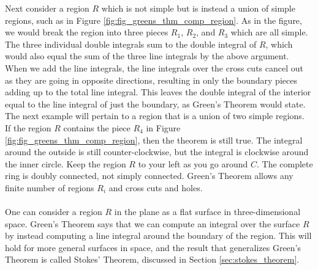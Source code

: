 
Next consider a region $R$ which is not simple but is instead a union of simple regions, such as in Figure \ref{fig:fig_greens_thm_comp_region}. As in the figure, we would break the region into three pieces $R_1$, $R_2$, and $R_3$ which are all simple. The three individual double integrals sum to the double integral of $R$, which would also equal the sum of the three line integrals by the above argument. When we add the line integrals, the line integrals over the cross cuts cancel out as they are going in opposite directions, resulting in only the boundary pieces adding up to the total line integral.  This leaves the double integral of the interior equal to the line integral of just the boundary, as Green's Theorem would state. The next example will pertain to a region that is a union of two simple regions. \\

If the region $R$ contains the piece $R_4$ in Figure \ref{fig:fig_greens_thm_comp_region}, then the theorem is still true. The
integral around the outside is still counter-clockwise, but the integral is clockwise around the inner circle. Keep the region $R$ to your left as you go around $C$. The complete ring is doubly connected, not simply connected. Green's Theorem allows any finite number of regions $R_i$ and cross cuts and holes.\\

\\

One can consider a region $R$ in the plane as a flat surface in three-dimensional space. Green's Theorem says that we can compute an integral over the surface $R$ by instead computing a line integral around the boundary of the region.  This will hold for more general surfaces in space, and the result that generalizes Green's Theorem is called Stokes' Theorem, discussed in Section \ref{sec:stokes_theorem}.

